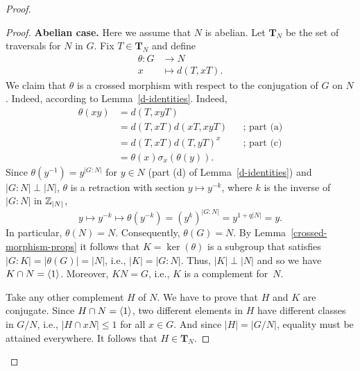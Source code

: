 \begin{proof}
\begin{proof}
    \textbf{Abelian case.} Here we assume that $N$ is abelian. Let $\mathbf T_N$ be the set of traversals for $N$ in $G$. Fix $T\in\mathbf T_N$ and define
    \begin{align*}
        \theta\colon G&\to N\\
        x&\mapsto d(T,xT).
    \end{align*}
    We claim that $\theta$ is a crossed morphism with respect to the conjugation of $G$ on $N$. Indeed, according to Lemma~\ref{d-identities}. Indeed,
    \begin{align*}
        \theta(xy) &= d(T,xyT)\\
            &= d(T,xT)d(xT,xyT) &&\text{; part (a)}\\
            &= d(T,xT)d(T,yT)^x &&\text{; part (c)}\\
            &= \theta(x)\sigma_x(\theta(y)).
    \end{align*}    
    Since $\theta(y^{-1})=y^{|G:N|}$ for $y\in N$ (part (d) of Lemma~\ref{d-identities}) and $|G:N|\perp|N|$, $\theta$ is a retraction with section $y\mapsto y^{-k}$, where $k$ is the inverse of $|G:N|$ in $\mathbb{Z}_{|N|}$,
    $$
        y\mapsto y^{-k}\mapsto\theta(y^{-k})=(y^k)^{|G:N|}= y^{1+q|N|}=y.
    $$
    In particular, $\theta(N)=N$. Consequently, $\theta(G)=N$. By Lemma~\ref{crossed-morphism-props} it follows that $K=\ker(\theta)$ is a subgroup that satisfies $|G:K|=|\theta(G)|=|N|$, i.e., $|K|=|G:N|$. Thus, $|K|\perp|N|$ and so we have $K\cap N=\langle1\rangle$. Moreover, $KN=G$, i.e., $K$ is a complement for~$N$.
    
    Take any other complement $H$ of $N$. We have to prove that $H$ and $K$ are conjugate. Since $H\cap N=\langle1\rangle$, two different elements in $H$ have different classes in $G/N$, i.e., $|H\cap xN|\le1$ for all $x\in G$. And since $|H|=|G/N|$, equality must be attained everywhere. It follows that $H\in\mathbf T_N$.
    

\end{proof}
\end{proof}
